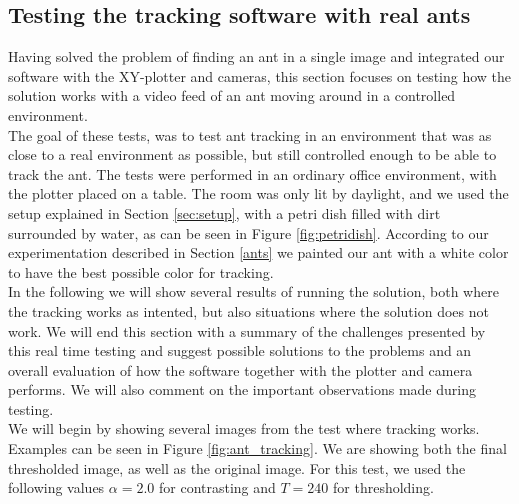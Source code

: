 
% 
% 


\subsection{Testing the tracking software with real ants}
\label{testing}

Having solved the problem of finding an ant in a single image and integrated our software with the XY-plotter and cameras, this section focuses on testing how the solution works with a video feed of an ant moving around in a controlled environment.\\

The goal of these tests, was to test ant tracking in an environment that was as close to a real environment as possible, but still controlled enough to be able to track the ant. The tests were performed in an ordinary office environment, with the plotter placed on a table. The room was only lit by daylight, and we used the setup explained in Section \ref{sec:setup}, with a petri dish filled with dirt surrounded by water, as can be seen in Figure \ref{fig:petridish}. According to our experimentation described in Section \ref{ants} we painted our ant with a white color to have the best possible color for tracking. \\

In the following we will show several results of running the solution, both where the tracking works as intented, but also situations where the solution does not work. We will end this section with a summary of the challenges presented by this real time testing and suggest possible solutions to the problems and an overall evaluation of how the software together with the plotter and camera performs. We will also comment on the important observations made during testing.\\

We will begin by showing several images from the test where tracking works. Examples can be seen in Figure \ref{fig:ant_tracking}. We are showing both the final thresholded image, as well as the original image. For this test, we used the following values $\alpha = 2.0$ for contrasting and $T = 240$ for thresholding.\\

